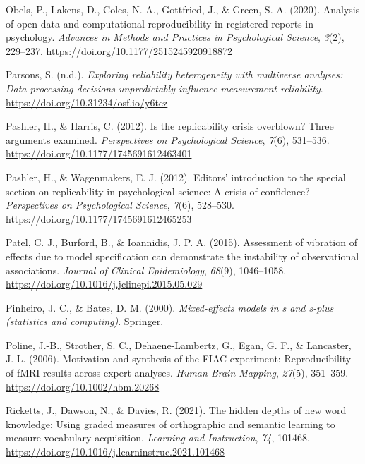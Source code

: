 \documentclass[
  letterpaper,
  DIV=11,
  numbers=noendperiod]{scrreprt}
\newlength{\cslhangindent}
\newlength{\cslentryspacingunit} %
\newenvironment{CSLReferences}[2] %
 {%
  \setlength{\parindent}{0pt}
  \ifodd #1
  \let\oldpar\par
  \def\par{\hangindent=\cslhangindent\oldpar}
  \fi
  \setlength{\parskip}{#2\cslentryspacingunit}
 }%
 {}
\begin{document}
\begin{CSLReferences}{1}{0}
\leavevmode{}%
Obels, P., Lakens, D., Coles, N. A., Gottfried, J., \& Green, S. A.
(2020). Analysis of open data and computational reproducibility in
registered reports in psychology. \emph{Advances in Methods and
Practices in Psychological Science}, \emph{3}(2), 229--237.
\url{https://doi.org/10.1177/2515245920918872}

\leavevmode{}%
Parsons, S. (n.d.). \emph{Exploring reliability heterogeneity with
multiverse analyses: Data processing decisions unpredictably influence
measurement reliability}. \url{https://doi.org/10.31234/osf.io/y6tcz}

\leavevmode{}%
Pashler, H., \& Harris, C. (2012). Is the replicability crisis
overblown? Three arguments examined. \emph{Perspectives on Psychological
Science}, \emph{7}(6), 531--536.
\url{https://doi.org/10.1177/1745691612463401}

\leavevmode{}%
Pashler, H., \& Wagenmakers, E. J. (2012). Editors' introduction to the
special section on replicability in psychological science: A crisis of
confidence? \emph{Perspectives on Psychological Science}, \emph{7}(6),
528--530. \url{https://doi.org/10.1177/1745691612465253}

\leavevmode{}%
Patel, C. J., Burford, B., \& Ioannidis, J. P. A. (2015). Assessment of
vibration of effects due to model specification can demonstrate the
instability of observational associations. \emph{Journal of Clinical
Epidemiology}, \emph{68}(9), 1046--1058.
\url{https://doi.org/10.1016/j.jclinepi.2015.05.029}

\leavevmode{}%
Pinheiro, J. C., \& Bates, D. M. (2000). \emph{Mixed-effects models in s
and s-plus (statistics and computing)}. Springer.

\leavevmode{}%
Poline, J.-B., Strother, S. C., Dehaene-Lambertz, G., Egan, G. F., \&
Lancaster, J. L. (2006). Motivation and synthesis of the FIAC
experiment: Reproducibility of fMRI results across expert analyses.
\emph{Human Brain Mapping}, \emph{27}(5), 351--359.
\url{https://doi.org/10.1002/hbm.20268}

\leavevmode{}%
Ricketts, J., Dawson, N., \& Davies, R. (2021). The hidden depths of new
word knowledge: Using graded measures of orthographic and semantic
learning to measure vocabulary acquisition. \emph{Learning and
Instruction}, \emph{74}, 101468.
\url{https://doi.org/10.1016/j.learninstruc.2021.101468}


\end{CSLReferences}
\end{document}
